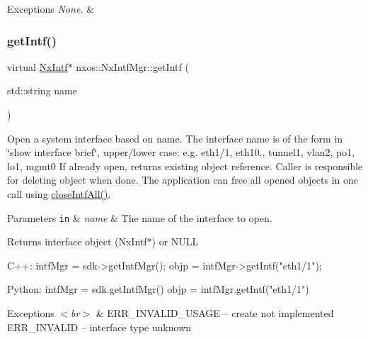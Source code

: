 \begin{DoxyExceptions}{Exceptions}
{\em None.} & \\
\hline
\end{DoxyExceptions}
\mbox{\label{classnxos_1_1_nx_intf_mgr_a1271144b1921be0dcb27a6aa7310bbc5}} 
\subsubsection{\texorpdfstring{get\+Intf()}{getIntf()}}
{\footnotesize\ttfamily virtual \mbox{\hyperlink{classnxos_1_1_nx_intf}{Nx\+Intf}}$\ast$ nxos\+::\+Nx\+Intf\+Mgr\+::get\+Intf (\begin{DoxyParamCaption}\item[{std\+::string}]{name }\end{DoxyParamCaption})\hspace{0.3cm}{\ttfamily [pure virtual]}}

Open a system interface based on name. The interface name is of the form in \char`\"{}show interface brief\char`\"{}, upper/lower case\+: e.\+g. eth1/1, eth10., tunnel1, vlan2, po1, lo1, mgmt0 If already open, returns existing object reference. Caller is responsible for deleting object when done. The application can free all opened objects in one call using \mbox{\hyperlink{classnxos_1_1_nx_intf_mgr_a45e7cb2a8e3919667c14264dd618168a}{close\+Intf\+All()}}. 
\begin{DoxyParams}[1]{Parameters}
\mbox{\tt in}  & {\em name} & The name of the interface to open. \\
\hline
\end{DoxyParams}
\begin{DoxyReturn}{Returns}
interface object (Nx\+Intf$\ast$) or N\+U\+LL 
\begin{DoxyCode}
C++:
   intfMgr = sdk->getIntfMgr();
   objp = intfMgr->getIntf(\textcolor{stringliteral}{"eth1/1"});

Python:
   intfMgr = sdk.getIntfMgr()
   objp = intfMgr.getIntf(\textcolor{stringliteral}{"eth1/1"})
\end{DoxyCode}

\end{DoxyReturn}

\begin{DoxyExceptions}{Exceptions}
{\em $<$br$>$} & E\+R\+R\+\_\+\+I\+N\+V\+A\+L\+I\+D\+\_\+\+U\+S\+A\+GE -- \textquotesingle{}create\textquotesingle{} not implemented E\+R\+R\+\_\+\+I\+N\+V\+A\+L\+ID -- interface type unknown \\
\hline
\end{DoxyExceptions}
\mbox{\label{classnxos_1_1_nx_intf_mgr_af70ee700e633a9f5ae35608d7637ee04}} 
